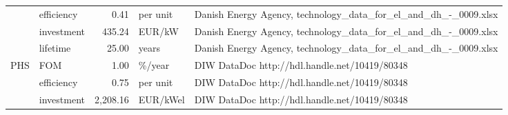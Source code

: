 \begin{longtable}{p{5cm}p{3cm}rp{3cm}p{11cm}}
                      & efficiency &           0.41 &                          per unit &                                                                                                                                                                                                                                                                      Danish Energy Agency, technology\_data\_for\_el\_and\_dh\_-\_0009.xlsx \\
                      & investment &         435.24 &                            EUR/kW &                                                                                                                                                                                                                                                                      Danish Energy Agency, technology\_data\_for\_el\_and\_dh\_-\_0009.xlsx \\
                      & lifetime &          25.00 &                             years &                                                                                                                                                                                                                                                                      Danish Energy Agency, technology\_data\_for\_el\_and\_dh\_-\_0009.xlsx \\
PHS & FOM &           1.00 &                            \%/year &                                                                                                                                                                                                                                                                                        DIW DataDoc http://hdl.handle.net/10419/80348 \\
                      & efficiency &           0.75 &                          per unit &                                                                                                                                                                                                                                                                                        DIW DataDoc http://hdl.handle.net/10419/80348 \\
                      & investment &       2,208.16 &                          EUR/kWel &                                                                                                                                                                                                                                                                                        DIW DataDoc http://hdl.handle.net/10419/80348 \\

\end{longtable}
